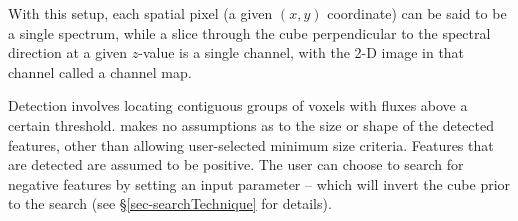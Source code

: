 With this setup, each spatial pixel (a given $(x,y)$ coordinate) can
be said to be a single spectrum, while a slice through the cube
perpendicular to the spectral direction at a given $z$-value is a
single channel, with the 2-D image in that channel called a channel
map.

Detection involves locating contiguous groups of voxels with fluxes
above a certain threshold. \duchamp makes no assumptions as to the
size or shape of the detected features, other than allowing
user-selected minimum size criteria. Features that are detected are
assumed to be positive. The user can choose to search for negative
features by setting an input parameter -- which will invert the cube
prior to the search (see \S\ref{sec-searchTechnique} for details).


